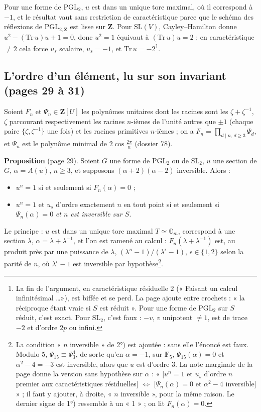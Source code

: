 \documentclass[11pt,a4paper]{article}
\begin{document}
Pour une forme de $\mathrm{PGL}_2$, $u$ est dans un unique tore maximal, où il
correspond à $-1$, et le résultat vaut sans restriction de caractéristique
parce que le schéma des réflexions de $\mathrm{PGL}_{2,\mathbf{Z}}$ est lisse
sur $\mathbf{Z}$. Pour $\mathrm{SL}(V)$, Cayley--Hamilton donne $u^2 -
(\mathrm{Tr}\, u) u + 1 = 0$, donc $u^2 = 1$ équivaut à $(\mathrm{Tr}\, u)u =
2$ ; en caractéristique $\neq 2$ cela force $u_s$ scalaire, $u_s = -1$, et
$\mathrm{Tr}\, u = -2$\footnote{La fin de l'argument, en caractéristique
résiduelle $2$ (« Faisant un calcul infinitésimal \ldots »), est biffée et se
perd. La page ajoute entre crochets : « la réciproque étant vraie si $S$ est
réduit ». Pour une forme de $\mathrm{PGL}_2$ sur $S$ réduit, c'est exact.
Pour $\mathrm{SL}_2$, c'est faux : $-v$, $v$ unipotent $\neq 1$, est de trace
$-2$ et d'ordre $2p$ ou infini.}.

\subsection*{L'ordre d'un élément, lu sur son invariant (pages 29 à 31)}

Soient $F_n$ et $\Psi_n \in \mathbf{Z}[U]$ les polynômes unitaires dont les
racines sont les $\zeta + \zeta^{-1}$, $\zeta$ parcourant respectivement les
racines $n$-ièmes de l'unité autres que $\pm 1$ (chaque paire
$\{\zeta, \zeta^{-1}\}$ une fois) et les racines primitives $n$-ièmes ; on a
$F_n = \prod_{d \mid n,\, d \geq 3} \Psi_d$, et $\Psi_n$ est le polynôme minimal
de $2\cos\frac{2\pi}{n}$ (dossier 78).

\textbf{Proposition} (page 29). Soient $G$ une forme de $\mathrm{PGL}_2$ ou de
$\mathrm{SL}_2$, $u$ une section de $G$, $\alpha = A(u)$, $n \geq 3$, et
supposons $(\alpha + 2)(\alpha - 2)$ inversible. Alors :
\begin{itemize}
  \item[1°)] $u^n = 1$ si et seulement si $F_n(\alpha) = 0$ ;
  \item[2°)] $u^n = 1$ et $u_s$ d'ordre exactement $n$ en tout point si et
    seulement si $\Psi_n(\alpha) = 0$ \emph{et $n$ est inversible sur $S$}.
\end{itemize}
Le principe : $u$ est dans un unique tore maximal $T \simeq \mathbb{G}_m$,
correspond à une section $\lambda$, $\alpha = \lambda + \lambda^{-1}$, et
l'on est ramené au calcul : $F_n(\lambda + \lambda^{-1})$ est, au
produit près par une puissance de $\lambda$, $(\lambda^n - 1)/(\lambda^{\epsilon} -
1)$, $\epsilon \in \{1, 2\}$ selon la parité de $n$, où $\lambda^{\epsilon} - 1$ est inversible par
hypothèse\footnote{La condition « $n$ inversible » de 2°) est ajoutée : sans
elle l'énoncé est faux. Modulo $5$, $\Psi_{15} \equiv \Psi_3^4$, de sorte
qu'en $\alpha = -1$, sur $\mathbf{F}_5$, $\Psi_{15}(\alpha) = 0$ et
$\alpha^2 - 4 = -3$ est inversible, alors que $u$ est d'ordre $3$. La note
marginale de la page donne la version sans hypothèse sur $\alpha$ :
« [$u^n = 1$ et $u_s$ d'ordre $n$ premier aux caractéristiques résiduelles]
$\Leftrightarrow$ [$\Psi_n(\alpha) = 0$ et $\alpha^2 - 4$ inversible] » ; il faut
y ajouter, à droite, « $n$ inversible », pour la même raison. Le dernier signe
de 1°) ressemble à un « 1 » ; on lit $F_n(\alpha) = 0$.}.
\end{document}
